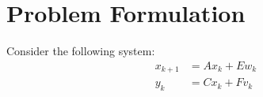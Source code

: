\chapter{Problem Formulation} \label{ch:problem}
Consider the following system:
\begin{equation}
\begin{split}
x_{k+1} &= Ax_k + Ew_k\\
y_k &= Cx_k + Fv_k
\end{split}\label{eq:model}
\end{equation}

